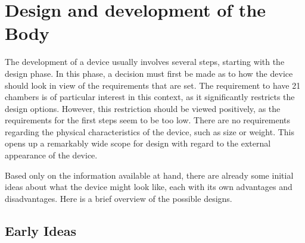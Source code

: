 \section{Design and development of the Body}\label{sec:Bodydesign}
The development of a device usually involves several steps, starting with the design phase. In this phase, a decision must first be made as to how the device should look in view of the requirements that are set. The requirement to have 21 chambers is of particular interest in this context, as it significantly restricts the design options. However, this restriction should be viewed positively, as the requirements for the first steps seem to be too low. There are no requirements regarding the physical characteristics of the device, such as size or weight. This opens up a remarkably wide scope for design with regard to the external appearance of the device.

Based only on the information available at hand, there are already some initial ideas about what the device might look like, each with its own advantages and disadvantages. Here is a brief overview of the possible designs.

\subsection{Early Ideas}
